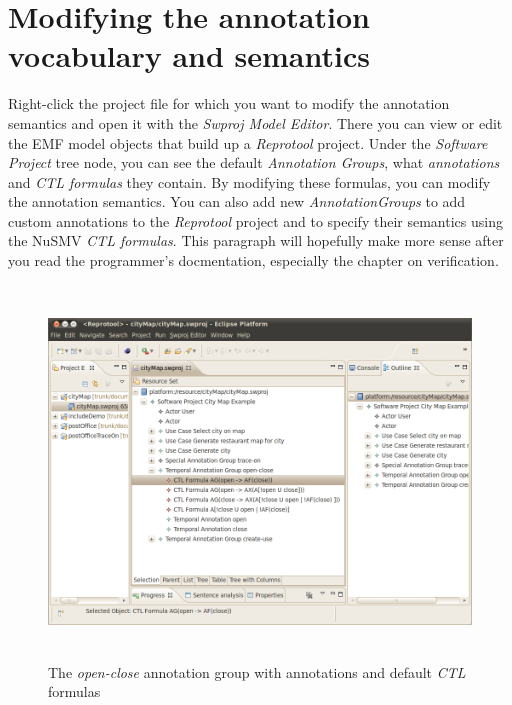 \section{Modifying the annotation vocabulary and semantics}

Right-click the project file for which you want to modify the annotation semantics and open it with the \emph{Swproj Model Editor}.
There you can view or edit the EMF model objects that build up a \emph{Reprotool} project. Under the \emph{Software Project} tree node,
you can see the default \emph{Annotation Groups}, what \emph{annotations} and \emph{CTL formulas} they contain. By modifying these
formulas, you can modify the annotation semantics. You can also add new \emph{AnnotationGroups} to add custom annotations to the
\emph{Reprotool} project and to specify their semantics using the NuSMV \emph{CTL formulas}. This paragraph will hopefully make more
sense after you read the programmer's docmentation, especially the chapter on verification.


\begin{figure}[ht]
  \centering
  \includegraphics[height=280pt]{images/reprotoolCTLFormulas}
  \caption{The \emph{open-close} annotation group with annotations and default \emph{CTL} formulas}
  \label{fig:reprotoolCTLFormulas}
\end{figure}
